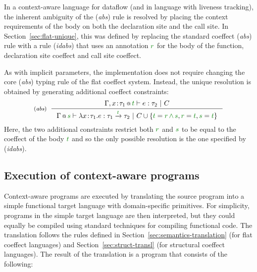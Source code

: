 \begin{example}
In a context-aware language for dataflow (and in language with liveness tracking), the inherent
ambiguity of the (\emph{abs}) rule is resolved by placing the context requirements of the body on
both the declaration site and the call site. In Section~\ref{sec:flat-unique}, this was defined by
replacing the standard coeffect (\emph{abs}) rule with a rule (\emph{idabs}) that uses an
annotation $\cclrd{r}$ for the body of the function, declaration site coeffect and call site coeffect.

As with implicit parameters, the implementation does not require changing the core (\emph{abs})
typing rule of the flat coeffect system. Instead, the unique resolution is obtained by generating
additional coeffect constraints:
%
\begin{equation*}
\tyrule{abs}
  {\coctx{\Gamma, x\!:\!\tau_1}{\cclrd{t}} \vdash e : \tau_2 ~|~ C}
  {\coctx{\Gamma}{\cclrd{s}} \vdash \lambda x\!:\!\tau_1.e : \tau_1 \xrightarrow{\cclrd{t}} \tau_2 ~|~
    C\cup\{\cclrd{t}=\cclrd{r} \,\czip\, \cclrd{s}, \cclrd{r}=\cclrd{t}, \cclrd{s}=\cclrd{t} \}}
\end{equation*}
%
Here, the two additional constraints restrict both $\cclrd{r}$ and $\cclrd{s}$ to be equal to the
coeffect of the body $\cclrd{t}$ and so the only possible resolution is the one specified by
(\emph{idabs}).
\end{example}


\subsection{Execution of context-aware programs}
\label{sec:impl-theory-transl}

Context-aware programs are executed by translating the source program into a simple functional
target language with domain-specific primitives. For simplicity, programs in the simple target
language are then interpreted, but they could equally be compiled using standard techniques for
compiling functional code. The translation follows the rules defined in Section~\ref{sec:semantics-translation}
(for flat coeffect languages) and Section~\ref{sec:struct-transl} (for structural coeffect
languages). The result of the translation is a program that consists of the following:


